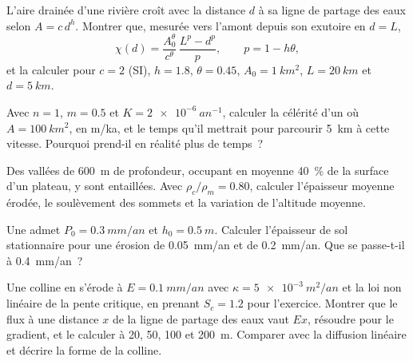 \begin{exercise}[$\star\star$]\label{exo:b3:quantitative-geomorphology:6}
L'aire drainée d'une rivière croît avec la distance $d$ à sa ligne de partage des eaux selon $A =
c\,d^{h}$. Montrer que, mesurée vers l'amont depuis son exutoire en $d = L$,
\[
\chi(d) = \frac{A_0^{\theta}}{c^{\theta}}\,\frac{L^{p} - d^{p}}{p},
\qquad p = 1 - h\theta ,
\]
et la calculer pour $c = 2$ (SI), $h = 1.8$, $\theta = 0.45$, $A_0 =
\qty{1}{km^2}$, $L = \qty{20}{km}$ et $d = \qty{5}{km}$.
\end{exercise}

\begin{exercise}[$\star\star$]\label{exo:b3:quantitative-geomorphology:7}
Avec $n = 1$, $m = 0.5$ et $K = \qty{2e-6}{an^{-1}}$, calculer la
célérité d'un  où $A = \qty{100}{km^2}$, en m/ka, et le temps
qu'il mettrait pour parcourir \qty{5}{km} à cette vitesse. Pourquoi
prend-il en réalité plus de temps~?
\end{exercise}

\begin{exercise}[$\star\star$]\label{exo:b3:quantitative-geomorphology:8}
Des vallées de \qty{600}{m} de profondeur, occupant en moyenne \qty{40}{\percent} de la
surface d'un plateau, y sont entaillées. Avec $\rho_c/\rho_m = 0.80$, calculer
l'épaisseur moyenne érodée, le soulèvement des sommets et la variation de
l'altitude moyenne.
\end{exercise}

\begin{exercise}[$\star\star$]\label{exo:b3:quantitative-geomorphology:9}
Une  admet $P_0 = \qty{0.3}{mm/an}$ et $h_0 =
\qty{0.5}{m}$. Calculer l'épaisseur de sol stationnaire pour une érosion de
\qty{0.05}{mm/an} et de \qty{0.2}{mm/an}. Que se passe-t-il à
\qty{0.4}{mm/an}~?
\end{exercise}

\begin{exercise}[$\star\star\star$]\label{exo:b3:quantitative-geomorphology:10}
Une colline en  s'érode à $E = \qty{0.1}{mm/an}$ avec $\kappa =
\qty{5e-3}{m^2/an}$ et la loi non linéaire de la pente critique, en prenant
$S_c = 1.2$ pour l'exercice. Montrer que le flux à une distance $x$ de la
ligne de partage des eaux vaut $E x$, résoudre pour le gradient, et le calculer à 20, 50, 100 et
\qty{200}{m}. Comparer avec la diffusion linéaire et décrire la forme de la
colline.
\end{exercise}

